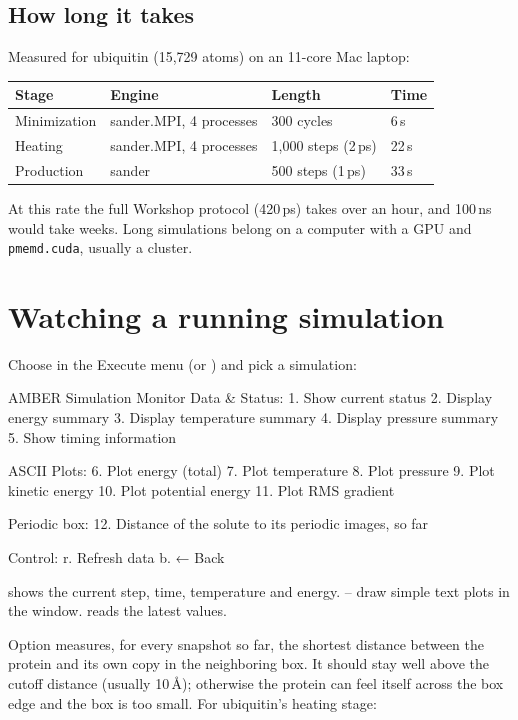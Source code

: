 \subsection{How long it takes}

Measured for ubiquitin (15,729 atoms) on an 11-core Mac laptop:

\begin{tabularx}{\linewidth}{@{}lllL@{}}
\toprule
\textbf{Stage} & \textbf{Engine} & \textbf{Length} & \textbf{Time} \\
\midrule
Minimization & sander.MPI, 4 processes & 300 cycles & 6\,s \\
Heating & sander.MPI, 4 processes & 1,000 steps (2\,ps) & 22\,s \\
Production & sander & 500 steps (1\,ps) & 33\,s \\
\bottomrule
\end{tabularx}

\medskip
At this rate the full Workshop protocol (420\,ps) takes over an hour, and
100\,ns would take weeks. Long simulations belong on a computer with a GPU and
\texttt{pmemd.cuda}, usually a cluster.

\section{Watching a running simulation}\label{sec:runningmd-monitor}

Choose  in the Execute menu (or  ) and pick a
simulation:

\begin{screen}
AMBER Simulation Monitor
Data & Status:
 1. Show current status
 2. Display energy summary
 3. Display temperature summary
 4. Display pressure summary
 5. Show timing information

ASCII Plots:
 6. Plot energy (total)
 7. Plot temperature
 8. Plot pressure
 9. Plot kinetic energy
10. Plot potential energy
11. Plot RMS gradient

Periodic box:
12. Distance of the solute to its periodic images, so far

Control:
 r. Refresh data
 b. ← Back
\end{screen}

 shows the current step, time, temperature and energy. --
draw simple text plots in the window.  reads the latest values.

Option  measures, for every snapshot so far, the shortest distance
between the protein and its own copy in the neighboring box. It should stay
well above the cutoff distance (usually 10\,Å); otherwise the protein can
feel itself across the box edge and the box is too small. For ubiquitin's
heating stage:

